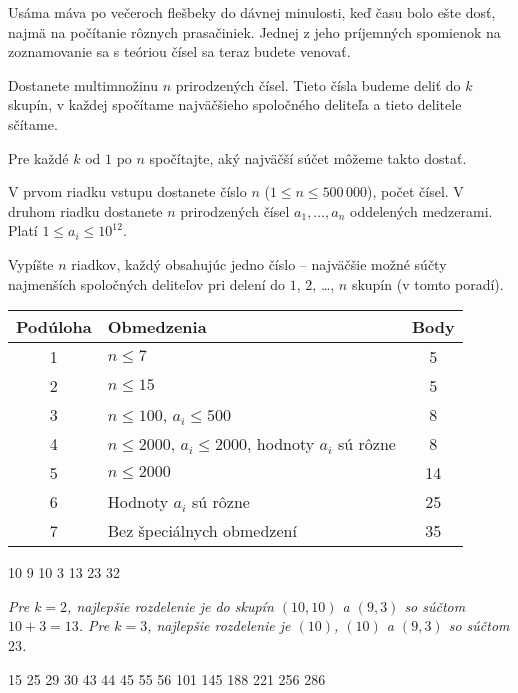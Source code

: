 
\usepackage[slovak]{babel}





Usáma máva po večeroch flešbeky do dávnej minulosti, keď času bolo ešte dosť, najmä
na počítanie rôznych prasačiniek. Jednej z jeho príjemných spomienok na zoznamovanie
sa s teóriou čísel sa teraz budete venovať.


Dostanete multimnožinu $n$ prirodzených čísel. Tieto čísla budeme deliť do $k$ skupín,
v každej spočítame najväčšieho spoločného deliteľa a tieto delitele sčítame.

Pre každé $k$ od $1$ po $n$ spočítajte, aký najväčší súčet môžeme takto dostať.


V prvom riadku vstupu dostanete číslo $n$ ($1 \leq n \leq 500\,000$), počet čísel. V
druhom riadku dostanete $n$ prirodzených čísel $a_1, \ldots, a_n$ oddelených medzerami.
Platí $1 \leq a_i \leq 10^{12}$.


Vypíšte $n$ riadkov, každý obsahujúc jedno číslo -- najväčšie možné súčty
najmenších spoločných deliteľov pri delení do $1$, $2$, \ldots, $n$ skupín (v tomto poradí).


\begin{center}
  \begin{tabular}{|c|p{8cm}|c|}
    \hline
    \textbf{Podúloha} & \textbf{Obmedzenia} & \textbf{Body} \\ \hline
    1 & $n \leq 7$ & 5 \\ \hline
    2 & $n \leq 15$ & 5 \\ \hline
    3 & $n \leq 100$, $a_i \leq 500$ & 8 \\ \hline
    4 & $n \leq 2000$, $a_i \leq 2000$, hodnoty $a_i$ sú rôzne & 8 \\ \hline
    5 & $n \leq 2000$ & 14 \\ \hline
    6 & Hodnoty $a_i$ sú rôzne & 25 \\ \hline
    7 & Bez špeciálnych obmedzení & 35 \\ \hline
  \end{tabular}
\end{center}

10 9 10 3
13
23
32

\sampleEND

\noindent \textit{Pre $k = 2$, najlepšie rozdelenie je do skupín $(10,10)$ a $(9,3)$ so súčtom $10+3 = 13$. Pre $k=3$, najlepšie rozdelenie je $(10)$, $(10)$ a $(9,3)$ so súčtom $23$.}

\medskip

15 25 29 30 43 44 45 55
56
101
145
188
221
256
286

\sampleEND




